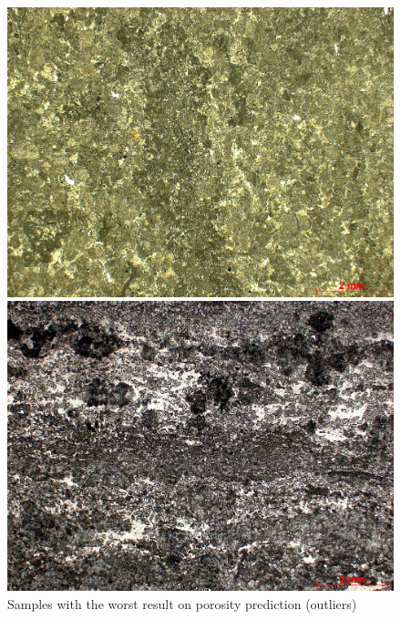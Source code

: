 \documentclass[a4paper,fleqn]{cas-sc}
\begin{document}
\begin{figure}[h!]
	\caption{Samples with the worst result on porosity prediction (outliers)}
	\label{fig:outliers}
	\centering%
	\begin{minipage}{0.4\textwidth}
		\includegraphics[width=\textwidth]{images/outlier_1.jpg}
	\end{minipage}
	\begin{minipage}{0.4\textwidth}
		\includegraphics[width=\textwidth]{images/outlier_2.jpg}
	\end{minipage}
\end{figure}
\end{document}
